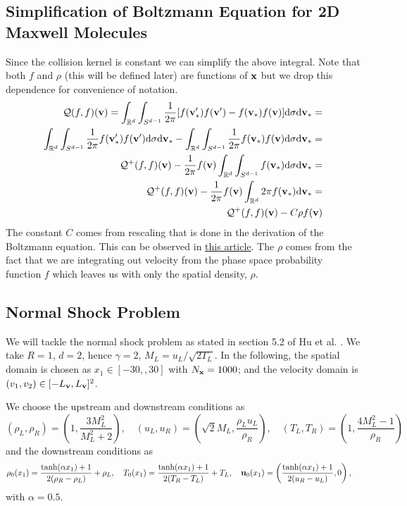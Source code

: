 \documentclass{article}
\def\t{\text}
\def\b{\textbf}
\begin{document}
\subsection{Simplification of Boltzmann Equation for 2D Maxwell Molecules}
Since the collision kernel is constant we can simplify the above integral. Note that both $f$ and $\rho$ (this will be defined later) are functions of $\b x$ but we drop this dependence for convenience of notation.
\begin{align*}
    \mathcal{Q}(f,f)(\b v) = \int_{\mathbb{R}^d} \int_{S^{d-1}} \frac{1}{2\pi}[f(\b v_*') f(\b v') - f(\b v_*) f(\b v)] \t d \sigma \t d \b v_* =\\
    \int_{\mathbb{R}^d} \int_{S^{d-1}} \frac{1}{2\pi}f(\b v_*') f(\b v') \t d \sigma \t d \b v_* - \int_{\mathbb{R}^d} \int_{S^{d-1}} \frac{1}{2\pi} f(\b v_*) f(\b v) \t d \sigma \t d \b v_* = \\
    \mathcal{Q}^+(f,f)(\b v) - \frac{1}{2\pi} f(\b v) \int_{\mathbb{R}^d} \int_{S^{d-1}}  f(\b v_*) \t d \sigma \t d \b v_* =\\
    \mathcal{Q}^+(f,f)(\b v) - \frac{1}{2\pi} f(\b v) \int_{\mathbb{R}^d} 2 \pi f(\b v_*) \t d \b v_* =\\
    \mathcal{Q}^+(f,f)(\b v) - C \rho f(\b v)
\end{align*}
The constant $C$ comes from rescaling that is done in the derivation of the Boltzmann equation. This can be observed in \href{https://gyu-eun-lee.github.io/academic/gso_boltzmann.pdf}{this article}. The $\rho$ comes from the fact that we are integrating out velocity from the phase space probability function $f$ which leaves us with only the spatial density, $\rho$.
\subsection{Normal Shock Problem}
We will tackle the normal shock problem as stated in section 5.2 of Hu et al. \cite{hu2021adaptive}. We take $R=1$, $d=2$, hence $\gamma=2$, $M_L=u_L / \sqrt{2T_L}$. In the following, the spatial domain is chosen as $x_1 \in [-30,,30]$ with $N_{\b x} = 1000$; and the velocity domain is $(v_1,v_2) \in [-L_{\b v},L_{\b v}]^2$.

We choose the upstream and downstream conditions as
\[
    (\rho_L,\rho_R) = \left( 1, \frac{3M_L^2}{M_L^2 + 2}\right), \quad
    (u_L, u_R) = \left(\sqrt{2} M_L, \frac{\rho_L u_L}{\rho_R}\right), \quad
    (T_L, T_R) = \left(1, \frac{4M_L^2 - 1}{\rho_R} \right)
\]
and the downstream conditions as
\[
    \rho_0(x_1) = \frac{\tanh(\alpha x_1) + 1}{2(\rho_R - \rho_L)} + \rho_L, \quad
    T_0(x_1) = \frac{\tanh(\alpha x_1) + 1}{2(T_R - T_L)} + T_L, \quad
    \b u_0(x_1) = \left(\frac{\tanh(\alpha x_1) + 1}{2(u_R - u_L)}, 0 \right), \quad
\]
with $\alpha = 0.5$.
\end{document}
